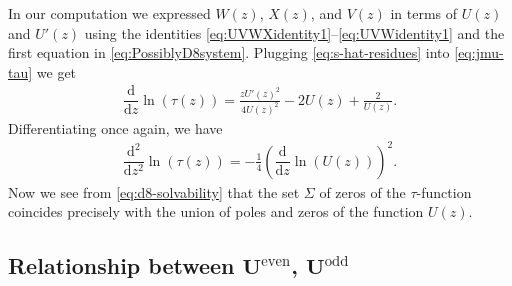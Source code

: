 \documentclass[11pt]{article}
\numberwithin{equation}{section}
\numberwithin{equation}{section}
\begin{document}
In our computation we expressed $W(z)$, $X(z)$, and $V(z)$ in terms of $U(z)$ and $U'(z)$ using the identities \eqref{eq:UVWXidentity1}--\eqref{eq:UVWidentity1} and the first equation in \eqref{eq:PossiblyD8system}. Plugging \eqref{eq:s-hat-residues} into \eqref{eq:jmu-tau} we get
\begin{gather*}
\dfrac{\mathrm{d}}{\mathrm{d}z}\ln(\tau(z))=\frac{zU'(z)^2}{4U(z)^2}-
 2 U(z)+\frac2{U(z)}.
\end{gather*}
Differentiating once again, we have
\begin{gather} \label{eq:d8-solvability}
\dfrac{\mathrm{d}^2}{\mathrm{d}z^2}\ln(\tau(z))=-\frac{1}{4}\left(\dfrac{\mathrm{d}}{\mathrm{d}z}\ln(U(z))\right)^2.
\end{gather}
 Now we see from \eqref{eq:d8-solvability} that the set $\Sigma$ of zeros of the $\tau$-function coincides precisely with the union of poles and zeros of the function $U(z)$.

\subsection[Relationship between U\^{}\{even\}, U\^{}\{odd\}]{Relationship between $\boldsymbol{U^{\mathrm{even}}}$, $\boldsymbol{U^{\mathrm{odd}}}$}
\end{document}
